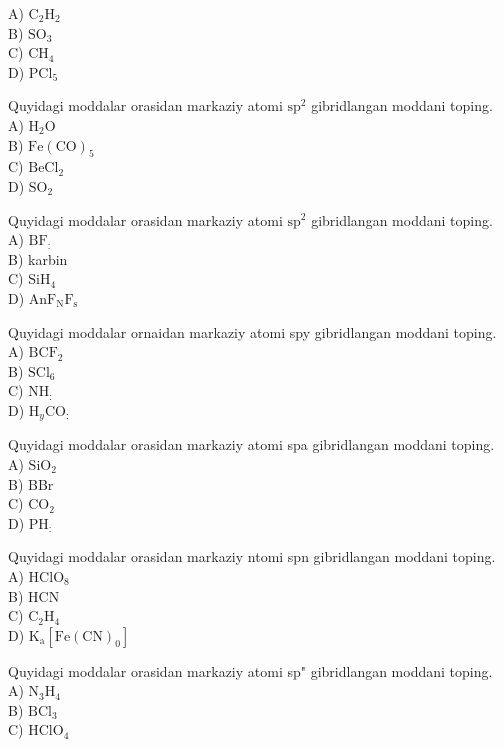 A) $\mathrm{C}_{2} \mathrm{H}_{2}$\\
B) $\mathrm{SO}_{3}$\\
C) $\mathrm{CH}_{4}$\\
D) $\mathrm{PCl}_{5}$\\
  \item Quyidagi moddalar orasidan markaziy atomi $\mathrm{sp}^{2}$ gibridlangan moddani toping.\\
A) $\mathrm{H}_{2} \mathrm{O}$\\
B) $\mathrm{Fe}(\mathrm{CO})_{5}$\\
C) $\mathrm{BeCl}_{2}$\\
D) $\mathrm{SO}_{2}$
  \item Quyidagi moddalar orasidan markaziy atomi $\mathrm{sp}^{2}$ gibridlangan moddani toping.\\
A) $\mathrm{BF}_{:}$\\
B) karbin\\
C) $\mathrm{SiH}_{4}$\\
D) $\mathrm{AnF}_{\mathrm{N}} \mathrm{F}_{\mathrm{s}}$
  \item Quyidagi moddalar ornaidan markaziy atomi spy gibridlangan moddani toping.\\
A) $\mathrm{BCF}_{2}$\\
B) $\mathrm{SCl}_{6}$\\
C) $\mathrm{NH}_{:}$\\
D) $\mathrm{H}_{y} \mathrm{CO}_{:}$
  \item Quyidagi moddalar orasidan markaziy atomi spa gibridlangan moddani toping.\\
A) $\mathrm{SiO}_{2}$\\
B) BBr\\
C) $\mathrm{CO}_{2}$\\
D) $\mathrm{PH}_{:}$
  \item Quyidagi moddalar orasidan markaziy ntomi spn gibridlangan moddani toping.\\
A) $\mathrm{HClO}_{8}$\\
B) HCN\\
C) $\mathrm{C}_{2} \mathrm{H}_{4}$\\
D) $\mathrm{K}_{\mathrm{a}}\left[\mathrm{Fe}(\mathrm{CN})_{0}\right]$
  \item Quyidagi moddalar orasidan markaziy atomi sp" gibridlangan moddani toping.\\
A) $\mathrm{N}_{3} \mathrm{H}_{4}$\\
B) $\mathrm{BCl}_{3}$\\
C) $\mathrm{HClO}_{4}$\\

